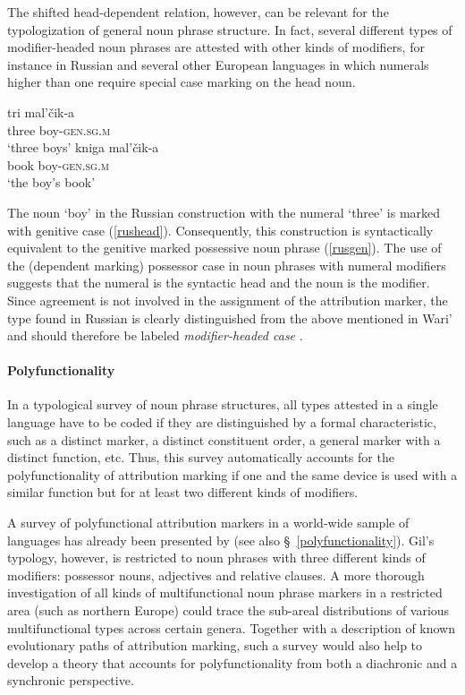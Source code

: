 The shifted head-dependent relation, however, can be relevant for the typologization of general noun phrase structure. In fact, several different types of modifier\hyp{}headed noun phrases are attested with other kinds of modifiers, for instance in Russian and several other European languages in which numerals higher than one require special case marking on the head noun.
\begin{exe}
\ex \label{russianheadstand} 
\begin{xlist}
\ex \label{rushead}
\gll tri mal'čik-a\\
  	three		boy-\textsc{gen.sg.m}\\
  \glt ‘three boys’
\ex \label{rusgen}
  \gll	kniga mal'čik-a\\
  	book	 boy-\textsc{gen.sg.m}\\
  \trans ‘the boy's book’
\end{xlist}
\end{exe}
The noun ‘boy’ in the Russian construction with the numeral ‘three’ is marked with genitive case (\ref{rushead}). Consequently, this construction is syntactically equivalent to the genitive marked possessive noun phrase (\ref{rusgen}). The use of the (dependent marking) possessor case in noun phrases with numeral modifiers suggests that the numeral is the syntactic head and the noun is the modifier. Since agreement is not involved in the assignment of the attribution marker, the type found in Russian is clearly distinguished from the above mentioned  in Wari' and should therefore be labeled \textit{modifier\hyp{}headed case} \citep[cf.]{AUTOTYP-NP}.

\paragraph*{Polyfunctionality} 
In a typological survey of noun phrase structures, all types attested in a single language have to be coded if they are distinguished by a formal characteristic, such as a distinct marker, a distinct constituent order, a general marker with a distinct function, etc. Thus, this survey automatically accounts for the polyfunctionality of attribution marking if one and the same device is used with a similar function but for at least two different kinds of modifiers.

A survey of polyfunctional attribution markers in a world-wide sample of languages has already been presented by \citet{gil2005} (see also \S~\ref{polyfunctionality}). Gil's typology, however, is restricted to noun phrases with three different kinds of modifiers: possessor nouns, adjectives and relative clauses. A more thorough investigation of all kinds of multifunctional noun phrase markers in a restricted area (such as northern Europe) could trace the sub-areal distributions of various multifunctional types across certain genera. Together with a description of known evolutionary paths of attribution marking, such a survey would also help to develop a theory that accounts for polyfunctionality from both a diachronic and a synchronic perspective.
